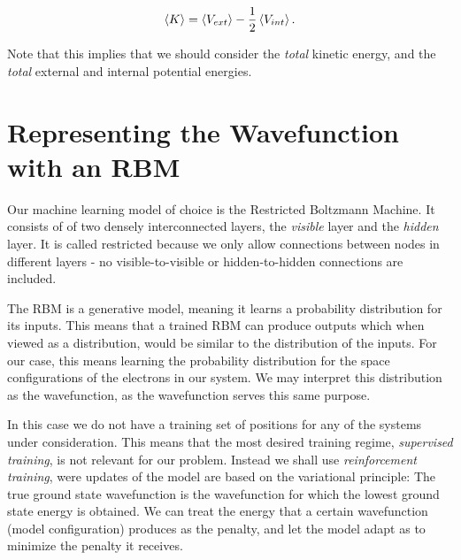 \documentclass[a4paper, 11pt]{article}
\begin{document}
\begin{multicols}{2}
    \begin{align}
        \expval{K} = \expval{V_{ext}} -
        \frac{1}{2}\expval{V_{int}}.\label{eq:virial-result}
    \end{align}

    Note that this implies that we should consider the \emph{total} kinetic
    energy, and the \emph{total} external and internal potential energies. 

    \section{Representing the Wavefunction with an RBM}

    Our machine learning model of choice is the Restricted Boltzmann Machine. It
    consists of of two densely interconnected layers, the \emph{visible} layer
    and the \emph{hidden} layer. It is called restricted because we only
    allow connections between nodes in different layers - no visible-to-visible or
    hidden-to-hidden connections are included.

    The RBM is a generative model, meaning it learns a probability distribution
    for its inputs. This means that a trained RBM can produce outputs which
    when viewed as a distribution, would be similar to the distribution of the
    inputs. For our case, this means learning the probability distribution for
    the space configurations of the electrons in our system. We may interpret
    this distribution as the wavefunction, as the wavefunction serves this same
    purpose.

    In this case we do not have a training set of positions for any of the
    systems under consideration. This means that the most desired training
    regime, \emph{supervised training}, is not relevant for our problem. Instead
    we shall use \emph{reinforcement training}, were updates of the model are
    based on the variational principle: The true ground state wavefunction is
    the wavefunction for which the lowest ground state energy is obtained. We
    can treat the energy that a certain wavefunction (model configuration)
    produces as the penalty, and let the model adapt as to minimize the penalty
    it receives.


\end{multicols}
\end{document}
